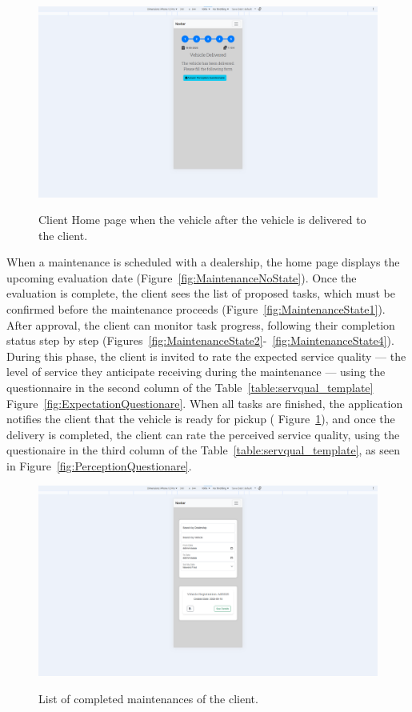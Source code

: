 \begin{figure}[h]
  \caption{Client Home page when the vehicle after the vehicle is delivered to the client.}
  \centering
  \includegraphics[width=\textwidth]{figs/Implementation/client/MaintenanceState5}
  \label{fig:MaintenanceState5}
\end{figure}



When a maintenance is scheduled with a dealership, the home page displays the upcoming evaluation date (Figure~\ref{fig:MaintenanceNoState}). Once the evaluation is complete, the client sees the list of proposed tasks, which must be confirmed before the maintenance proceeds (Figure~\ref{fig:MaintenanceState1}). After approval, the client can monitor task progress, following their completion status step by step (Figures~\ref{fig:MaintenanceState2}-~\ref{fig:MaintenanceState4}). During this phase, the client is invited to rate the expected service quality — the level of service they anticipate receiving during the maintenance — using the questionnaire in the second column of the Table~\ref{table:servqual_template} Figure~\ref{fig:ExpectationQuestionare}. When all tasks are finished, the application notifies the client that the vehicle is ready for pickup ( Figure~\ref{fig:MaintenanceState5}), and once the delivery is completed, the client can rate the perceived service quality, using the questionaire in the third column of the Table~\ref{table:servqual_template}, as seen in Figure~\ref{fig:PerceptionQuestionare}.

\begin{figure}[h]
  \caption{List of completed maintenances of the client.}
  \centering
  \includegraphics[width=\textwidth]{figs/Implementation/client/MaintenanceHistory}
  \label{fig:clientMaintenanceHistory}
\end{figure}


